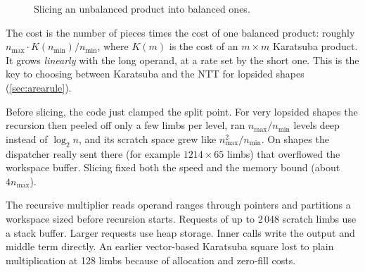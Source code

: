 \begin{figure}[ht]
\centering
{}
\caption{Slicing an unbalanced product into balanced ones.}
\end{figure}

The cost is the number of pieces times the cost of one balanced product: roughly
$n_{\max} \cdot K(n_{\min}) / n_{\min}$, where $K(m)$ is the cost of an $m \times m$
Karatsuba product. It grows \emph{linearly} with the long operand, at a rate set by the
short one. This is the key to choosing between Karatsuba and the NTT for lopsided shapes
(\cref{sec:arearule}).

\begin{pitfall}
Before slicing, the code just clamped the split point. For very lopsided shapes the
recursion then peeled off only a few limbs per level, ran $n_{\max}/n_{\min}$ levels deep
instead of $\log_2 n$, and its scratch space grew like $n_{\max}^2/n_{\min}$. On shapes the
dispatcher really sent there (for example $1214 \times 65$ limbs) that overflowed the
workspace buffer. Slicing fixed both the speed and the memory bound (about $4 n_{\max}$).
\end{pitfall}

\begin{perfnote}
The recursive multiplier reads operand ranges through pointers and partitions a
workspace sized before recursion starts. Requests of up to 2\,048 scratch limbs
use a stack buffer. Larger requests use heap storage. Inner calls write the
output and middle term directly. An earlier vector-based Karatsuba square lost
to plain multiplication at 128 limbs because of allocation and zero-fill costs.
\end{perfnote}

